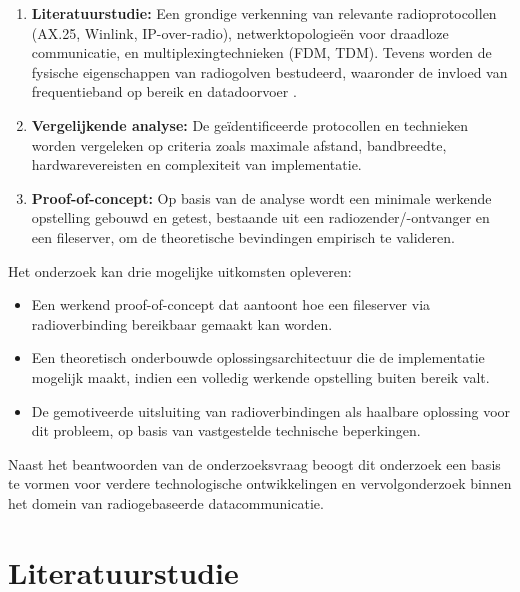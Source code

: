 \begin{enumerate}
  \item \textbf{Literatuurstudie:} Een grondige verkenning van relevante radioprotocollen (AX.25, Winlink, IP-over-radio), netwerktopologieën voor draadloze communicatie, en multiplexingtechnieken (FDM, TDM). Tevens worden de fysische eigenschappen van radiogolven bestudeerd, waaronder de invloed van frequentieband op bereik en datadoorvoer \autocite{Tanenbaum2021}.
  \item \textbf{Vergelijkende analyse:} De geïdentificeerde protocollen en technieken worden vergeleken op criteria zoals maximale afstand, bandbreedte, hardwarevereisten en complexiteit van implementatie.
  \item \textbf{Proof-of-concept:} Op basis van de analyse wordt een minimale werkende opstelling gebouwd en getest, bestaande uit een radiozender/-ontvanger en een fileserver, om de theoretische bevindingen empirisch te valideren.
\end{enumerate}

Het onderzoek kan drie mogelijke uitkomsten opleveren:

\begin{itemize}
  \item Een werkend proof-of-concept dat aantoont hoe een fileserver via radioverbinding bereikbaar gemaakt kan worden.
  \item Een theoretisch onderbouwde oplossingsarchitectuur die de implementatie mogelijk maakt, indien een volledig werkende opstelling buiten bereik valt.
  \item De gemotiveerde uitsluiting van radioverbindingen als haalbare oplossing voor dit probleem, op basis van vastgestelde technische beperkingen.
\end{itemize}

Naast het beantwoorden van de onderzoeksvraag beoogt dit onderzoek een basis te vormen voor verdere technologische ontwikkelingen en vervolgonderzoek binnen het domein van radiogebaseerde datacommunicatie.

\section{Literatuurstudie}%
\label{sec:literatuurstudie}


